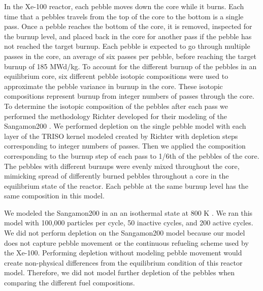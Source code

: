 In the Xe-100 reactor, each pebble moves down the core while it burns. Each 
time that a pebbles travels from the top of the core to the bottom is a single 
pass. Once a pebble reaches the bottom of the core, it is removed, inspected for 
the burnup level, and placed back in the core for another pass if the pebble has 
not reached the target burnup. Each pebble is expected to 
go through multiple passes in the core, an average 
of six passes per pebble, before reaching the target burnup of 185 
MWd/kg. To account for the different burnup of 
the pebbles in an equilibrium core, 
six different pebble isotopic compositions were used to approximate the pebble
variance in burnup in the core. These isotopic compositions represent burnup from 
integer numbers of passes through the core.
To determine the isotopic composition of the 
pebbles after each pass we performed the methodology 
Richter developed for their modeling of the Sangamon200 \cite{richter_isotopic_2022}. 
We performed depletion on the single pebble model with each layer of the 
\gls{TRISO} kernel modeled
created by Richter \cite{richter_zoerichterphlox_2022} with depletion steps 
corresponding to integer numbers of passes. Then we 
applied the composition corresponding to the burnup step of each pass 
to 1/6th of the pebbles of the core. The pebbles with different burnups 
were evenly mixed throughout the core, mimicking spread of 
differently burned pebbles throughout a core in the equilibrium state 
of the reactor. Each pebble at the same burnup level has the same 
composition in this model.   

We modeled the Sangamon200 in an an isothermal state at 800 K 
\cite{richter_isotopic_2022}.
We ran this model with 100,000 particles per cycle, 50 inactive cycles, 
and 200 active cycles. We did not perform depletion on the Sangamon200 model 
because our model does not capture pebble movement or the continuous 
refueling scheme used by the Xe-100. Performing depletion without modeling 
pebble movement 
would create non-physical differences from the equilibrium condition of 
this reactor model. Therefore, we did not model further depletion of the 
pebbles when comparing the different fuel compositions.


